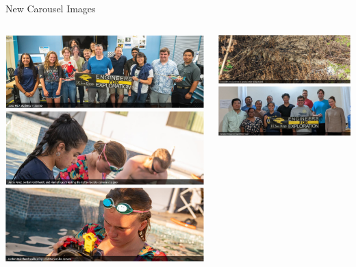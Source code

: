 \begin{frame}{New Carousel Images}
\begin{columns}
\begin{column}{0.33\textwidth}
            \includegraphics[width=\linewidth]{images/web_carousel_5.png}
            \includegraphics[width=\linewidth]{images/web_carousel_6.png}
            \includegraphics[width=\linewidth]{images/web_carousel_7.png}
        \end{column}
        \begin{column}{0.33\textwidth}
            \includegraphics[width=\linewidth]{images/web_carousel_8.png}
            \includegraphics[width=\linewidth]{images/web_carousel_9.png}

\end{column}
\end{columns}
\end{frame}
